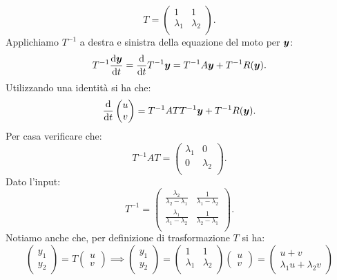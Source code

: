 \begin{exmp}
\[	T = 
    \begin{pmatrix}
	1  & 1 \\
	\lambda_1 & \lambda_2 \\
    \end{pmatrix}
    .\] 
    Applichiamo $T^{-1}$  a destra e sinistra della equazione del moto per $\boldsymbol{y}$:
    \[
        T^{-1}\frac{\text{d} \boldsymbol{y}}{\text{d} t} = \frac{\text{d} }{\text{d} t} T^{-1}\boldsymbol{y}=
	T^{-1}A \boldsymbol{y} + T^{-1}R(\boldsymbol{y}) 
    .\] 
    Utilizzando una identità si ha che:
    \[
        \frac{\text{d} }{\text{d} t} \begin{pmatrix} u \\ v \end{pmatrix}= 
	T^{-1}A TT^{-1}\boldsymbol{y} + T^{-1}R(\boldsymbol{y}) 
    .\] 
    Per casa verificare che:
    \[
        T^{-1}A T  = 
    \begin{pmatrix}
	 \lambda_1 & 0 \\
	 0 & \lambda_2  \\
    \end{pmatrix}
    .\] 
    Dato l'input:
    \[
        T^{-1}=
    \begin{pmatrix}
	\frac{\lambda_2}{\lambda_2-\lambda_1} & \frac{1}{\lambda_1-\lambda_2} \\
	\frac{\lambda_1}{\lambda_1-\lambda_2} & \frac{1}{\lambda_2-\lambda_1} \\
    \end{pmatrix}
    .\] 
    Notiamo anche che, per definizione di trasformazione $T$ si ha:
    \[
        \begin{pmatrix} y_1 \\ y_2 \end{pmatrix} = T \begin{pmatrix} u \\ v \end{pmatrix} \implies 
	\begin{pmatrix} y_1 \\ y_2 \end{pmatrix} = 
    \begin{pmatrix}
	1  & 1 \\
	\lambda_1 & \lambda_2 \\
    \end{pmatrix}
    \begin{pmatrix} u \\ v \end{pmatrix} = 
    \begin{pmatrix} u + v \\ \lambda_1 u + \lambda_2 v \end{pmatrix}
\]
\end{exmp}
